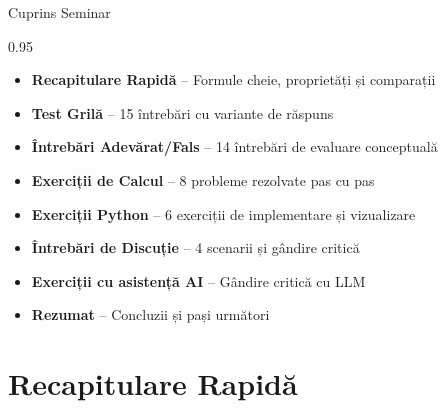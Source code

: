\documentclass[9pt, aspectratio=169, t]{beamer}
\subtitle{Seminar 2: Distribuții Clasice --- Normal, Student-$t$ și Pareto}
\begin{document}
{
\begin{frame}
    \titlepage
\end{frame}
}


\begin{frame}{Cuprins Seminar}
    \begin{cminipage}{0.95\textwidth}
    \begin{itemize}\setlength{\itemsep}{0pt}
        \item \textbf{Recapitulare Rapidă} -- Formule cheie, proprietăți și comparații
        \vspace{0.15cm}
        \item \textbf{Test Grilă} -- 15 întrebări cu variante de răspuns
        \vspace{0.15cm}
        \item \textbf{Întrebări Adevărat/Fals} -- 14 întrebări de evaluare conceptuală
        \vspace{0.15cm}
        \item \textbf{Exerciții de Calcul} -- 8 probleme rezolvate pas cu pas
        \vspace{0.15cm}
        \item \textbf{Exerciții Python} -- 6 exerciții de implementare și vizualizare
        \vspace{0.15cm}
        \item \textbf{Întrebări de Discuție} -- 4 scenarii și gândire critică
        \vspace{0.15cm}
        \item \textbf{Exerciții cu asistență AI} -- Gândire critică cu LLM
        \vspace{0.15cm}
        \item \textbf{Rezumat} -- Concluzii și pași următori
    \end{itemize}
    \end{cminipage}
\end{frame}

\section{Recapitulare Rapidă}
\end{document}
